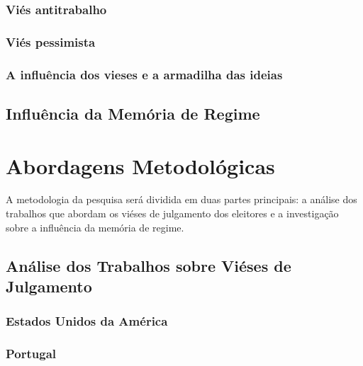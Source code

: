 \subsubsection{Viés antitrabalho}





\subsubsection{Viés pessimista}


\subsubsection{A influência dos vieses e a armadilha das ideias}


\subsection{Influência da Memória de Regime}

\section{Abordagens Metodológicas}
A metodologia da pesquisa será dividida em duas partes principais: a análise dos trabalhos que abordam os viéses de julgamento dos eleitores e a investigação sobre a influência da memória de regime.

\subsection{Análise dos Trabalhos sobre Viéses de Julgamento}

\subsubsection{Estados Unidos da América}

\subsubsection{Portugal}

